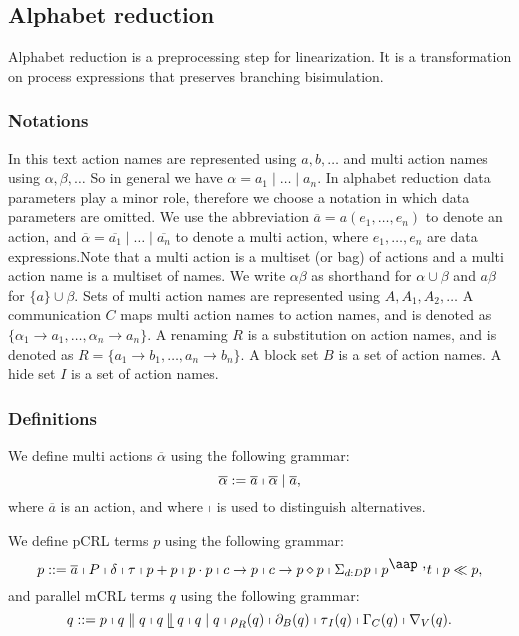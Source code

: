 \documentclass{article}
\begin{document}
\newpage

\subsection{Alphabet reduction}

Alphabet reduction is a preprocessing step for linearization. It is a
transformation on process expressions that preserves branching bisimulation.

\subsubsection{Notations}

In this text action names are represented using $a,b,\ldots $ and multi
action names using $\alpha ,\beta ,\ldots $ So in general we have $\alpha
=a_{1}\mid \ldots \mid a_{n}$. In alphabet reduction data parameters play a
minor role, therefore we choose a notation in which data parameters are
omitted. We use the abbreviation $\overline{a}=a(e_{1},\ldots ,e_{n})$ to
denote an action, and $\overline{\alpha }=\overline{a_{1}}\mid \ldots \mid 
\overline{a_{n}}$ to denote a multi action, where $e_{1},\ldots ,e_{n}$ are
data expressions.Note that a multi action is a multiset (or bag) of actions
and a multi action name is a multiset of names. We write $\alpha \beta $ as
shorthand for $\alpha \cup \beta $ and $a\beta $ for $\{a\}\cup \beta $.
Sets of multi action names are represented using $A,A_{1},A_{2},\ldots $ A
communication $C$ maps multi action names to action names, and is denoted as 
$\{\alpha _{1}\rightarrow a_{1},\ldots ,\alpha _{n}\rightarrow a_{n}\}$. A
renaming $R$ is a substitution on action names, and is denoted as $%
R=\{a_{1}\rightarrow b_{1},\ldots ,a_{n}\rightarrow b_{n}\}$. A block set $B$
is a set of action names. A hide set $I$ is a set of action names.

\subsubsection{Definitions}

We define multi actions $\overline{\alpha }$ using the following grammar:%
\[
\overline{\alpha }:=\overline{a}\shortmid \overline{\alpha }\mid \overline{a}%
, 
\]%
where $\overline{a}$ is an action, and where $\shortmid $ is used to
distinguish alternatives.

We define pCRL terms $p$ using the following grammar:%
\[
p::=\overline{a}\shortmid P\shortmid \delta \shortmid \tau \shortmid
p+p\shortmid p\cdot p\shortmid c\rightarrow p\shortmid c\rightarrow
p\diamond p\shortmid \Sigma _{d:D}p\shortmid p^{\mathbin{\mbox{\aap
,}}}t\shortmid p\ll p, 
\]%
and parallel mCRL terms $q$ using the following grammar:%
\[
q::=p\shortmid q\parallel q\shortmid q\mathbin{\mathrel{\llfloor}}q\shortmid
q\mid q\shortmid \rho _{R}(q)\shortmid \partial _{B}(q)\shortmid \tau
_{I}(q)\shortmid \Gamma _{C}(q)\shortmid \nabla _{V}(q). 
\]
\end{document}
